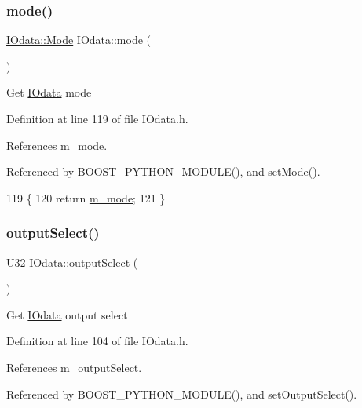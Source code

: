 \subsubsection{\texorpdfstring{mode()}{mode()}}
{\footnotesize\ttfamily \hyperlink{classIOdata_a044e9a4a0c6d25a43ebfe29c4fa4f1e5}{I\+Odata\+::\+Mode} I\+Odata\+::mode (\begin{DoxyParamCaption}{ }\end{DoxyParamCaption})\hspace{0.3cm}{\ttfamily [inline]}}

Get \hyperlink{classIOdata}{I\+Odata} mode 

Definition at line 119 of file I\+Odata.\+h.



References m\+\_\+mode.



Referenced by B\+O\+O\+S\+T\+\_\+\+P\+Y\+T\+H\+O\+N\+\_\+\+M\+O\+D\+U\+L\+E(), and set\+Mode().


\begin{DoxyCode}
119                    \{
120     \textcolor{keywordflow}{return} \hyperlink{classIOdata_a0782e31763fa855f1ecbd377dce538e6}{m\_mode};
121   \}
\end{DoxyCode}
\mbox{\label{classIOdata_aaa410b57a4607857d45ac6a7cd013307}} 
\subsubsection{\texorpdfstring{output\+Select()}{outputSelect()}}
{\footnotesize\ttfamily \hyperlink{classIOdata_a96fb57f5fcd87b708743abd3c86a5198}{U32} I\+Odata\+::output\+Select (\begin{DoxyParamCaption}{ }\end{DoxyParamCaption})\hspace{0.3cm}{\ttfamily [inline]}}

Get \hyperlink{classIOdata}{I\+Odata} output select 

Definition at line 104 of file I\+Odata.\+h.



References m\+\_\+output\+Select.



Referenced by B\+O\+O\+S\+T\+\_\+\+P\+Y\+T\+H\+O\+N\+\_\+\+M\+O\+D\+U\+L\+E(), and set\+Output\+Select().


